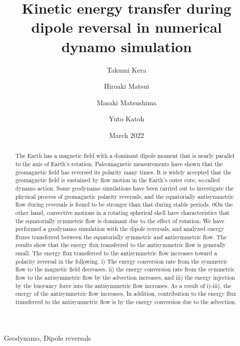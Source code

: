\documentclass[review]{elsarticle}
\date{March 2022}
\begin{document}
\title{Kinetic energy transfer during dipole reversal in numerical dynamo simulation}

\author[Tohoku]{Takumi Kera}
\author[ucd]{Hiroaki Matsui}
\author[TITECH]{Masaki Matsushima}
\author[Tohoku]{Yuto Katoh}

\address[Tohoku]{Department of Geophysics, Tohoku University, Sendai, Japan.}
\address[ucd]{Department of the Earth and Planetary Sciences, University of California, Davis, CA, USA.}
\address[TITECH]{Department of Earth and Planetary Sciences, Tokyo Institute of Technology, Tokyo, Japan.}

\begin{keyword}
Geodynamo, Dipole reversals
\end{keyword}

\begin{abstract}
The Earth has a magnetic field with a dominant dipole moment that is nearly parallel to the axis of Earth’s rotation. Paleomagnetic measurements have shown that the geomagnetic field has reversed its polarity many times. It is widely accepted that the geomagnetic field is sustained by flow motion in the Earth’s outer core, so-called dynamo action. Some geodynamo simulations have been carried out to investigate the physical process of geomagnetic polarity reversals, and the equatorially antisymmetric flow during reversals is found to be stronger than that during stable periods. 0On the other hand, convective motions in a rotating spherical shell have characteristics that the equatorially symmetric flow is dominant due to the effect of rotation. We have performed a geodynamo simulation with the dipole reversals, and  analyzed energy fluxes transferred between the equatorially symmetric and antisymmetric flow. The results show that the energy flux transferred to the antisymmetric flow is generally small. The energy flux transferred to the antisymmetric flow increases toward a polarity reversal in the following. i) The energy conversion rate from the symmetric flow to the magnetic field decreases, ii) the energy conversion rate from the symmetric flow to the antisymmetric flow by the advection increases, and iii) the energy injection by the buoyancy force into the antisymmetric flow increases. As a result of i)-iii), the energy of the antisymmetric flow increases. In addition, contribution to the energy flux transferred to the antisymmetric flow is by the energy conversion due to the advection.
\end{abstract}

\maketitle














\end{document}
